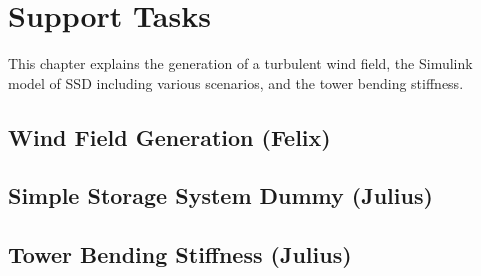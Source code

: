 \chapter{Support Tasks} \label{chapter: support tasks}
This chapter explains the generation of a turbulent wind field, the Simulink model of \gls{SSD} including various scenarios, and the tower bending stiffness.
\section{Wind Field Generation (Felix)}


\section{Simple Storage System Dummy (Julius)}


\section{Tower Bending Stiffness (Julius)}



